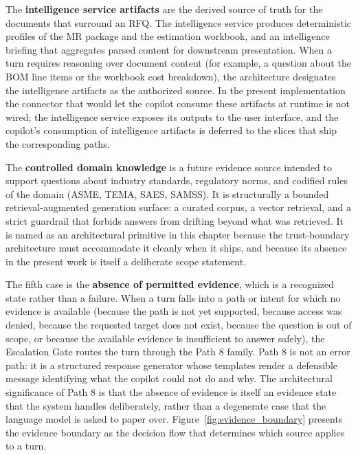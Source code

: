 The \textbf{intelligence service artifacts} are the derived source of truth for the documents that surround an RFQ. The intelligence service produces deterministic profiles of the MR package and the estimation workbook, and an intelligence briefing that aggregates parsed content for downstream presentation. When a turn requires reasoning over document content (for example, a question about the BOM line items or the workbook cost breakdown), the architecture designates the intelligence artifacts as the authorized source. In the present implementation the connector that would let the copilot consume these artifacts at runtime is not wired; the intelligence service exposes its outputs to the user interface, and the copilot's consumption of intelligence artifacts is deferred to the slices that ship the corresponding paths.

The \textbf{controlled domain knowledge} is a future evidence source intended to support questions about industry standards, regulatory norms, and codified rules of the domain (ASME, TEMA, SAES, SAMSS). It is structurally a bounded retrieval-augmented generation surface: a curated corpus, a vector retrieval, and a strict guardrail that forbids answers from drifting beyond what was retrieved. It is named as an architectural primitive in this chapter because the trust-boundary architecture must accommodate it cleanly when it ships, and because its absence in the present work is itself a deliberate scope statement.

The fifth case is the \textbf{absence of permitted evidence}, which is a recognized state rather than a failure. When a turn falls into a path or intent for which no evidence is available (because the path is not yet supported, because access was denied, because the requested target does not exist, because the question is out of scope, or because the available evidence is insufficient to answer safely), the Escalation Gate routes the turn through the Path 8 family. Path 8 is not an error path: it is a structured response generator whose templates render a defensible message identifying what the copilot could not do and why. The architectural significance of Path 8 is that the absence of evidence is itself an evidence state that the system handles deliberately, rather than a degenerate case that the language model is asked to paper over. Figure~\ref{fig:evidence_boundary} presents the evidence boundary as the decision flow that determines which source applies to a turn.


